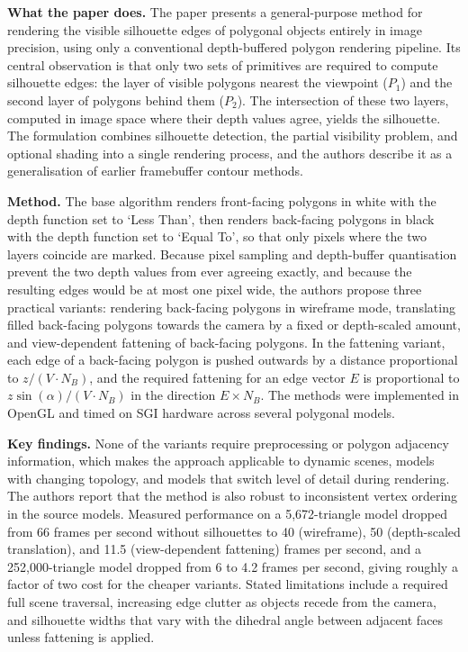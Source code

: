 \documentclass[11pt, a4paper]{article}
\begin{document}
\textbf{What the paper does.} The paper presents a general-purpose method for rendering the visible silhouette edges of polygonal objects entirely in image precision, using only a conventional depth-buffered polygon rendering pipeline. Its central observation is that only two sets of primitives are required to compute silhouette edges: the layer of visible polygons nearest the viewpoint ($P_1$) and the second layer of polygons behind them ($P_2$). The intersection of these two layers, computed in image space where their depth values agree, yields the silhouette. The formulation combines silhouette detection, the partial visibility problem, and optional shading into a single rendering process, and the authors describe it as a generalisation of earlier framebuffer contour methods.

\textbf{Method.} The base algorithm renders front-facing polygons in white with the depth function set to `Less Than', then renders back-facing polygons in black with the depth function set to `Equal To', so that only pixels where the two layers coincide are marked. Because pixel sampling and depth-buffer quantisation prevent the two depth values from ever agreeing exactly, and because the resulting edges would be at most one pixel wide, the authors propose three practical variants: rendering back-facing polygons in wireframe mode, translating filled back-facing polygons towards the camera by a fixed or depth-scaled amount, and view-dependent fattening of back-facing polygons. In the fattening variant, each edge of a back-facing polygon is pushed outwards by a distance proportional to $z / (V \cdot N_B)$, and the required fattening for an edge vector $E$ is proportional to $z \sin(\alpha) / (V \cdot N_B)$ in the direction $E \times N_B$. The methods were implemented in OpenGL and timed on SGI hardware across several polygonal models.

\textbf{Key findings.} None of the variants require preprocessing or polygon adjacency information, which makes the approach applicable to dynamic scenes, models with changing topology, and models that switch level of detail during rendering. The authors report that the method is also robust to inconsistent vertex ordering in the source models. Measured performance on a 5,672-triangle model dropped from 66 frames per second without silhouettes to 40 (wireframe), 50 (depth-scaled translation), and 11.5 (view-dependent fattening) frames per second, and a 252,000-triangle model dropped from 6 to 4.2 frames per second, giving roughly a factor of two cost for the cheaper variants. Stated limitations include a required full scene traversal, increasing edge clutter as objects recede from the camera, and silhouette widths that vary with the dihedral angle between adjacent faces unless fattening is applied.
\end{document}
